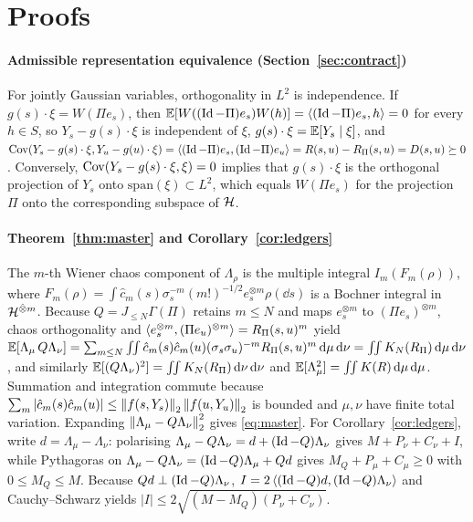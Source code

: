 \section{Proofs}\label{app:proofs}

\paragraph{Admissible representation equivalence (Section~\ref{sec:contract})}
For jointly Gaussian variables, orthogonality in $L^2$ is independence. If $g(s)\cdot\xi=W(\Pi e_s)$,
then $\mathbb{E}[W((\operatorname{Id}-\Pi)e_s)W(h)]=\left\langle (\operatorname{Id}-\Pi)e_s,h\right\rangle=0$ for every $h\in S$, so $Y_s-g(s)\cdot\xi$ is
independent of $\xi$, $g(s)\cdot\xi=\mathbb{E}[Y_s\mid\xi]$, and $\operatorname{Cov}(Y_s-g(s)\cdot\xi,Y_u-g(u)\cdot\xi)=
\left\langle (\operatorname{Id}-\Pi)e_s,(\operatorname{Id}-\Pi)e_u\right\rangle=R(s,u)-R_\Pi(s,u)=D(s,u)\succeq0$. Conversely, $\operatorname{Cov}(Y_s-g(s)\cdot\xi,\xi)=0$
implies that $g(s)\cdot\xi$ is the orthogonal projection of $Y_s$ onto $\mathrm{span}(\xi)\subset L^2$,
which equals $W(\Pi e_s)$ for the projection $\Pi$ onto the corresponding subspace of $\mathcal{H}$.

\paragraph{Theorem~\ref{thm:master} and Corollary~\ref{cor:ledgers}}
The $m$-th Wiener chaos component of $\Lambda_\rho$ is the multiple integral $I_m(F_m(\rho))$, where
$F_m(\rho)=\int\hat c_m(s)\sigma_s^{-m}(m!)^{-1/2}e_s^{\otimes m}\rho(\dd s)$ is a Bochner integral in
$\mathcal{H}^{\hat\otimes m}$. Because $Q=J_{\le N}\Gamma(\Pi)$ retains $m\le N$ and maps $e_s^{\otimes m}$ to
$(\Pi e_s)^{\otimes m}$, chaos orthogonality and $\left\langle e_s^{\otimes m},(\Pi e_u)^{\otimes m}\right\rangle=R_\Pi(s,u)^m$
yield $\mathbb{E}[\Lambda_\mu\,Q\Lambda_\nu]=\sum_{m\le N}\iint\hat c_m(s)\hat c_m(u)(\sigma_s\sigma_u)^{-m}R_\Pi(s,u)^m\,\mathrm{d}\mu\,\mathrm{d}\nu
=\iint K_N(R_\Pi)\,\mathrm{d}\mu\,\mathrm{d}\nu$, and similarly $\mathbb{E}[(Q\Lambda_\nu)^2]=\iint K_N(R_\Pi)\,\mathrm{d}\nu\,\mathrm{d}\nu$ and
$\mathbb{E}[\Lambda_\mu^2]=\iint K(R)\,\mathrm{d}\mu\,\mathrm{d}\mu$. Summation and integration commute because
$\sum_m|\hat c_m(s)\hat c_m(u)|\le\left\lVert f(s,Y_s)\right\rVert_2\left\lVert f(u,Y_u)\right\rVert_2$ is bounded and $\mu,\nu$ have finite
total variation. Expanding $\left\lVert \Lambda_\mu-Q\Lambda_\nu\right\rVert_2^2$ gives \eqref{eq:master}. For
Corollary~\ref{cor:ledgers}, write $d=\Lambda_\mu-\Lambda_\nu$: polarising
$\Lambda_\mu-Q\Lambda_\nu=d+(\operatorname{Id}-Q)\Lambda_\nu$ gives $M+P_\nu+C_\nu+I$, while Pythagoras on
$\Lambda_\mu-Q\Lambda_\nu=(\operatorname{Id}-Q)\Lambda_\mu+Qd$ gives $M_Q+P_\mu+C_\mu\ge0$ with $0\le M_Q\le M$.
Because $Qd\perp(\operatorname{Id}-Q)\Lambda_\nu$, $I=2\left\langle (\operatorname{Id}-Q)d,(\operatorname{Id}-Q)\Lambda_\nu\right\rangle$ and Cauchy--Schwarz yields
$|I|\le2\sqrt{(M-M_Q)(P_\nu+C_\nu)}$.


